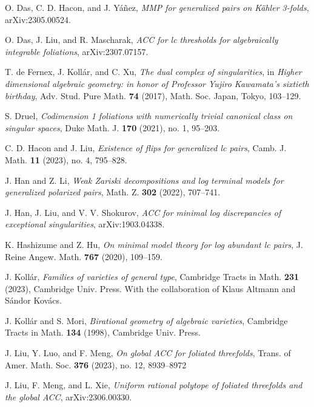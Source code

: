 \documentclass[11pt]{amsart}
\numberwithin{equation}{section}
\theoremstyle{definition}
\theoremstyle{definition}
\theoremstyle{definition}
\begin{document}
\begin{thebibliography}{99}
 O. Das, C. D. Hacon, and J. Y\'a\~nez, \textit{MMP for generalized pairs on K\"ahler 3-folds}, arXiv:2305.00524.

 O. Das, J. Liu, and R. Mascharak, \textit{ACC for lc thresholds for algebraically integrable foliations}, arXiv:2307.07157.

 T. de Fernex, J. Koll\'ar, and C. Xu, \textit{The dual complex of singularities}, in \textit{Higher dimensional algebraic geometry: in honor of Professor Yujiro Kawamata’s sixtieth birthday}, Adv. Stud. Pure Math. \textbf{74} (2017), Math. Soc. Japan, Tokyo, 103--129. 

 S. Druel, \textit{Codimension 1 foliations with numerically trivial canonical class on singular spaces}, Duke Math. J. \textbf{170} (2021), no. 1, 95--203.



 C. D. Hacon and J. Liu, \textit{Existence of flips for generalized lc pairs}, Camb. J. Math. \textbf{11} (2023), no. 4, 795--828.  


 J. Han and Z. Li, \textit{Weak Zariski decompositions and log terminal models for generalized polarized pairs}, Math. Z. \textbf{302} (2022), 707--741.

 J. Han, J. Liu, and V. V. Shokurov, \textit{ACC for minimal log discrepancies of exceptional singularities}, arXiv:1903.04338.


  K. Hashizume and Z. Hu, \textit{On minimal model theory for log abundant lc pairs}, J. Reine Angew. Math. \textbf{767} (2020), 109--159. 

 J. Koll\'ar, \textit{Families of varieties of general type}, Cambridge Tracts in Math. \textbf{231} (2023), Cambridge Univ. Press. With the collaboration of Klaus Altmann and S\'andor Kov\'acs.


 J. Koll\'{a}r and S. Mori, \textit{Birational geometry of algebraic varieties}, Cambridge Tracts in Math. \textbf{134} (1998), Cambridge Univ. Press.


 J. Liu, Y. Luo, and F. Meng, \textit{On global ACC for foliated threefolds},  Trans. of Amer. Math. Soc. \textbf{376} (2023), no. 12, 8939--8972


 J. Liu, F. Meng, and L. Xie, \textit{Uniform rational polytope of foliated threefolds and the global ACC}, arXiv:2306.00330.


\end{thebibliography}
\end{document}
